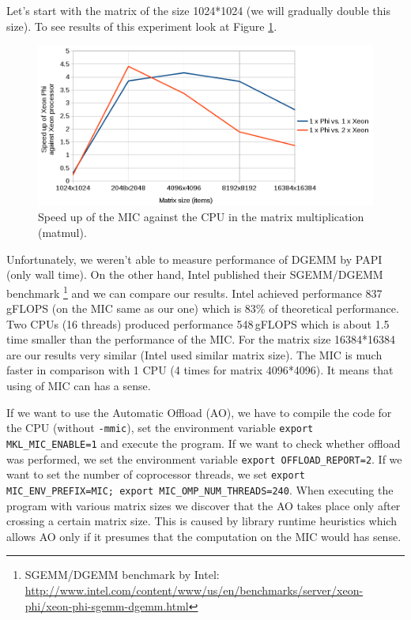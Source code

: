 \par Let's start with the matrix of the size 1024*1024 (we will gradually double this size). To see results of this experiment look at Figure \ref{fig:graph_matmul_xeon_vs_phi}.

\begin{figure}[htbp]
    \centering
    \includegraphics[width=1\linewidth]{fig/matmul_xeon_vs_phi.png}
    \caption{Speed up of the MIC against the CPU in the matrix multiplication (matmul).}
    \label{fig:graph_matmul_xeon_vs_phi}
\end{figure} 

\par Unfortunately, we weren't able to measure performance of DGEMM by PAPI (only wall time). On the other hand, Intel published their SGEMM/DGEMM benchmark \footnote{SGEMM/DGEMM benchmark by Intel:\\ \url{http://www.intel.com/content/www/us/en/benchmarks/server/xeon-phi/xeon-phi-sgemm-dgemm.html}} and we can compare our results. Intel achieved performance 837\,gFLOPS (on the MIC same as our one) which is 83\% of theoretical performance. Two CPUs (16 threads) produced performance 548\,gFLOPS which is about 1.5 time smaller than the performance of the MIC. For the matrix size 16384*16384 are our results very similar (Intel used similar matrix size). The MIC is much faster in comparison with 1 CPU (4 times for matrix 4096*4096). It means that using of MIC can has a sense.

\par If we want to use the Automatic Offload (AO), we have to compile the code for the CPU (without \texttt{-mmic}), set the environment variable \texttt{export MKL\_MIC\_ENABLE=1} and execute the program. If we want to check whether offload was performed, we set the environment variable \texttt{export OFFLOAD\_REPORT=2}. If we want to set the number of coprocessor threads, we set \texttt{export MIC\_ENV\_PREFIX=MIC; export MIC\_OMP\_NUM\_THREADS=240}. When executing the program with various matrix sizes we discover that the AO takes place only after crossing a certain matrix size. This is caused by library runtime heuristics which allows AO only if it presumes that the computation on the MIC would has sense.


